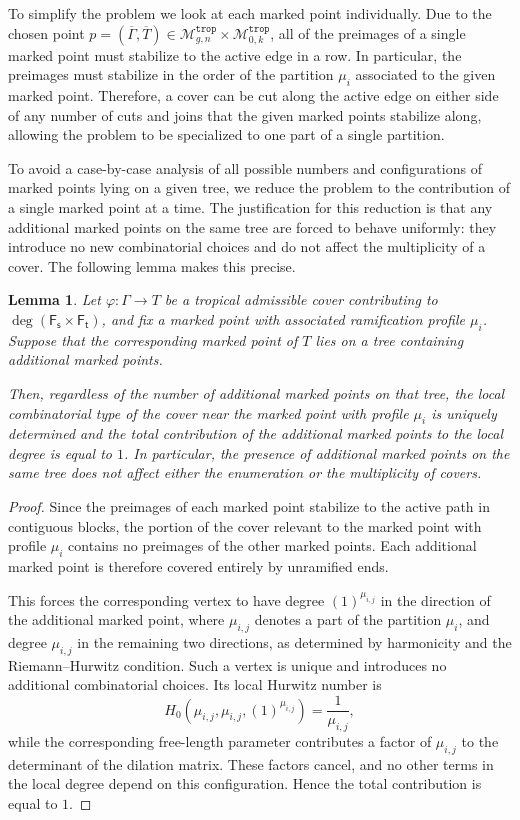 \documentclass[11pt,reqno]{amsart}
\newtheorem{lemma}[theorem]{Lemma}
\theoremstyle{definition}
\newcommand\trop{{\mathtt{trop}}}
\newcommand\Mgn[1]{\mathcal M_{#1}}
\newcommand{\Ft}{\mathsf{F_t}}
\newcommand{\Fs}{\mathsf{F_s}}
\begin{document}
To simplify the problem we look at each marked point individually. Due to the chosen point $p=(\overline{\Gamma},\overline{T})\in \Mgn{g,n}^\trop\times\Mgn{0,k}^\trop$, all of the preimages of a single marked point must stabilize to the active edge in a row. In particular, the preimages must stabilize in the order of the partition $\mu_i$ associated to the given marked point. Therefore, a cover can be cut along the active edge on either side of any number of cuts and joins that the given marked points stabilize along, allowing the problem to be specialized to one part of a single partition. 

To avoid a case-by-case analysis of all possible numbers and configurations of marked
points lying on a given tree, we reduce the problem to the contribution of a single
marked point at a time. The justification for this reduction is that any additional
marked points on the same tree are forced to behave uniformly: they introduce no new
combinatorial choices and do not affect the multiplicity of a cover. The following
lemma makes this precise.

\begin{lemma}
Let $\varphi \colon \Gamma \to T$ be a tropical admissible cover contributing to
$\deg(\Fs \times \Ft)$, and fix a marked point with associated ramification profile
$\mu_i$. Suppose that the corresponding marked point of $T$ lies on a tree containing
additional marked points.

Then, regardless of the number of additional marked points on that tree, the local
combinatorial type of the cover near the marked point with profile $\mu_i$ is uniquely
determined and the total contribution of the additional marked points to the local
degree is equal to $1$. In particular, the presence of additional marked points on the
same tree does not affect either the enumeration or the multiplicity of covers.
\end{lemma}

\begin{proof}
Since the preimages of each marked point stabilize to the active path in contiguous
blocks, the portion of the cover relevant to the marked point with profile $\mu_i$
contains no preimages of the other marked points. Each additional marked point is
therefore covered entirely by unramified ends.

This forces the corresponding vertex to have degree $(1)^{\mu_{i,j}}$ in the direction
of the additional marked point, where $\mu_{i,j}$ denotes a part of the partition $\mu_i$, and degree $\mu_{i,j}$ in the remaining two directions,
as determined by harmonicity and the Riemann--Hurwitz condition. Such a vertex is unique
and introduces no additional combinatorial choices. Its local Hurwitz number is
\[
H_0(\mu_{i,j},\mu_{i,j},(1)^{\mu_{i,j}})=\frac{1}{\mu_{i,j}},
\]
while the corresponding free-length parameter contributes a factor of $\mu_{i,j}$ to the
determinant of the dilation matrix. These factors cancel, and no other terms in the local
degree depend on this configuration. Hence the total contribution is equal to $1$.
\end{proof}
\end{document}
